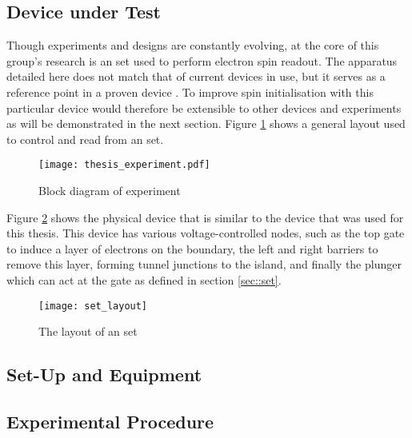 \label{sec::real-time}
\subsection{Device under Test}
\label{sec::experiment}
Though experiments and designs are constantly evolving, at the core of this group's research is an \gls{set} used to perform electron spin readout. The apparatus detailed here does not match that of current devices in use, but it serves as a reference point in a proven device \cite{morello2010single}. To improve spin initialisation with this particular device would therefore be extensible to other devices and experiments as will be demonstrated in the next section.
Figure \ref{fig::thesis_experiment} shows a general layout used to control and read from an \gls{set}.

\begin{figure}[htbp!]
	\centering
	\texttt{[image: thesis\_experiment.pdf]}
	\caption{Block diagram of experiment}
	\label{fig::thesis_experiment}
\end{figure}


Figure \ref{fig::set_layout} shows the physical device that is similar to the device that was used for this thesis. This device has various voltage-controlled nodes, such as the top gate to induce a layer of electrons on the boundary, the left and right barriers to remove this layer, forming tunnel junctions to the island, and finally the plunger which can act at the gate as defined in section \ref{sec::set}.

\begin{figure}[htbp!]
	\centering
	\texttt{[image: set\_layout]}
	\caption[Layout of an \gls{set}]{The layout of an \gls{set}\cite{morello2010single}}
	\label{fig::set_layout}
\end{figure}

\subsection{Set-Up and Equipment}

\subsection{Experimental Procedure}

